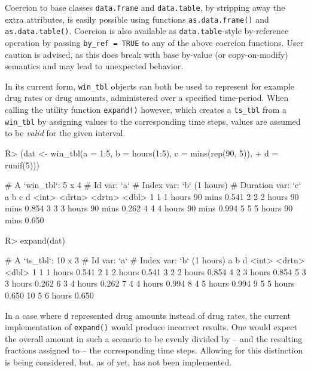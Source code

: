 \documentclass[
  notitle,
  nojss,
  noheadings]{jss}
\begin{document}
Coercion to base classes \texttt{data.frame} and \texttt{data.table}, by
stripping away the extra attributes, is easily possible using functions
\texttt{as.data.frame()} and \texttt{as.data.table()}. Coercion is also
available as \texttt{data.table}-style by-reference operation by passing
\texttt{by\_ref\ =\ TRUE} to any of the above coercion functions. User
caution is advised, as this does break with base  by-value
(or copy-on-modify) semantics and may lead to unexpected behavior.

In its current form, \texttt{win\_tbl} objects can both be used to
represent for example drug rates or drug amounts, administered over a
specified time-period. When calling the utility function
\texttt{expand()} however, which creates a \texttt{ts\_tbl} from a
\texttt{win\_tbl} by assigning values to the corresponding time steps,
values are assumed to be \emph{valid} for the given interval.

\begin{CodeChunk}
\begin{CodeInput}
R> (dat <- win_tbl(a = 1:5, b = hours(1:5), c = mins(rep(90, 5)),
+                 d = runif(5)))
\end{CodeInput}
\begin{CodeOutput}
# A `win_tbl`:  5 x 4
# Id var:       `a`
# Index var:    `b` (1 hours)
# Duration var: `c`
      a b       c           d
  <int> <drtn>  <drtn>  <dbl>
1     1 1 hours 90 mins 0.541
2     2 2 hours 90 mins 0.854
3     3 3 hours 90 mins 0.262
4     4 4 hours 90 mins 0.994
5     5 5 hours 90 mins 0.650
\end{CodeOutput}
\begin{CodeInput}
R> expand(dat)
\end{CodeInput}
\begin{CodeOutput}
# A `ts_tbl`: 10 x 3
# Id var:     `a`
# Index var:  `b` (1 hours)
       a b           d
   <int> <drtn>  <dbl>
 1     1 1 hours 0.541
 2     1 2 hours 0.541
 3     2 2 hours 0.854
 4     2 3 hours 0.854
 5     3 3 hours 0.262
 6     3 4 hours 0.262
 7     4 4 hours 0.994
 8     4 5 hours 0.994
 9     5 5 hours 0.650
10     5 6 hours 0.650
\end{CodeOutput}
\end{CodeChunk}

In a case where \texttt{d} represented drug amounts instead of drug
rates, the current implementation of \texttt{expand()} would produce
incorrect results. One would expect the overall amount in such a
scenario to be evenly divided by -- and the resulting fractions assigned
to -- the corresponding time steps. Allowing for this distinction is
being considered, but, as of yet, has not been implemented.
\end{document}
